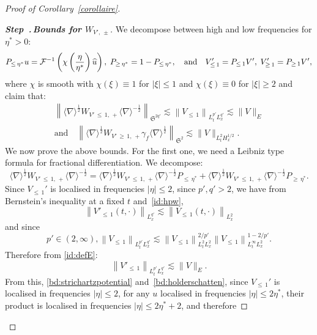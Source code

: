 \documentclass[10pt]{amsart}
\theoremstyle{definition}\newtheorem{defi}[theo]{Definition}\newtheorem{rema}[theo]{Remark}\newtheorem{exam}[theo]{Example}\newtheorem{exem}[theo]{Example}\newtheorem{nota}[theo]{Notation}
\newcommand{\mclF}{\mathcal{F}}
\newcommand{\frkS}{\mathfrak{S}}
\newcounter{stepcount}
\newenvironment{step}[1]{\refstepcounter{stepcount}\begin{proof}[{\bf{Step~\thestepcount}{.\,\emph{#1}}}]}{\let\qed\relax\end{proof}}
\let\oldhat\hat
\renewcommand*{\hat}[1]{\mathchoice{\widehat{#1}}{\widehat{#1}}{\oldhat{#1}}{\oldhat{#1}}}
\begin{document}
\begin{proof}[Proof of Corollary~\ref{corollaire}]
\vspace{4pt}
\begin{step}{{Bounds for $W_{V',\,\pm}$}}\label{proofcoro1.2step2}
We decompose between high and low frequencies for $\eta^*>0$:
\[
P_{\leq\,\eta^*}u=\mclF^{-1} \left(\chi \left(\frac{\eta}{\eta^*}\right)\hat u\right), \; P_{\geq\,\eta^*}=1-P_{\leq\,\eta^*}, \quad \text{and}\quad V'_{\leq\,1}=P_{\leq\,1}V', \; V'_{\geq\,1}=P_{\geq\,1}V',
\]
where $\chi$ is smooth with $\chi(\xi)\equiv 1$ for $|\xi|\leq 1$ and $\chi(\xi)\equiv 0$ for $|\xi|\geq 2$ and claim that:
\begin{multline} \label{bd:WVlocalised}
\left\| \langle \nabla \rangle^{\frac 12} W_{V'\,\leq\, 1,\,+}\langle \nabla \rangle^{-\frac 12}\right\|_{\frkS^{2q'}}\lesssim \left\| V_{\leq\,1}\right\|_{L^{p'}_tL^{q'}_{x}}\lesssim \| V \|_{E}\\
 \text{and} \quad \left\| \langle \nabla \rangle^{\frac 12} W_{V'\,\geq\,1,\,+} \gamma_f \langle \nabla \rangle^{\frac 12}\right\|_{\frkS^{2}}\lesssim \| V \|_{L^2_tH^{1/2}_x}.
\end{multline}
We now prove the above bounds. For the first one, we need a Leibniz type formula for fractional differentiation. We decompose:
\begin{equation} \label{id:decompositionWVleq1}
\langle \nabla \rangle^{\frac 12} W_{V'\,\leq\,1,\,+}\langle \nabla \rangle^{-\frac 12}=\langle \nabla \rangle^{\frac 12} W_{V'\,\leq\,1,\,+}\langle \nabla \rangle^{-\frac 12}P_{\leq\,\eta^*}+\langle \nabla \rangle^{\frac 12} W_{V'\,\leq\,1,\,+}\langle \nabla \rangle^{-\frac 12}P_{\geq\,\eta^*}.
\end{equation} Since $V_{\leq\,1}'$ is localised in frequencies $|\eta|\leq 2$, since $p',q'>2$, we have from Bernstein's inequality at a fixed $t$ and~\eqref{id:hpw},
\[
\left\|V'_{\leq\,1}(t,\cdot)\right\|_{L^{q'}_x} \lesssim \left\|V_{\leq\,1}(t,\cdot)\right\|_{L^2_x}
\]
and since
\[
p' \in (2,\infty), \left\| V_{\leq\,1} \right\|_{L^{p'}_tL^{q'}_x}\lesssim \left\| V_{\leq\,1} \right\|_{L^{2}_tL^{2}_x}^{2/p'}\left\| V_{\leq\,1} \right\|_{L^{\infty}_tL^{2}_x}^{1-2/p'}.
\]
Therefore from \eqref{id:defE}:
\begin{equation} \label{bd:Vlocalisedstrichartz}
\left\| V'_{\leq\,1}\right\|_{L^{p'}_tL^{q'}_x}\lesssim \| V \|_{E}.
\end{equation} From this, \eqref{bd:strichartzpotential} and~\eqref{bd:holderschatten}, since $V_{\leq\,1}'$ is localised in frequencies $|\eta|\leq 2$, for any $u$ localised in frequencies $|\eta| \leq 2\eta^*$, their product is localised in frequencies $|\eta| \leq 2\eta^* + 2$, and therefore


\end{step}
\end{proof}
\end{document}
